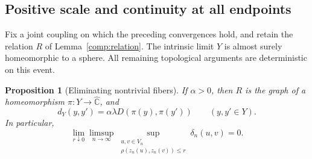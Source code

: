\documentclass[11pt]{article}
\numberwithin{equation}{section}
\newtheorem{proposition}[theorem]{Proposition}
\theoremstyle{definition}
\theoremstyle{remark}
\newcommand{\Chat}{\widehat{\mathbb C}}
\newcommand{\1}{\mathbf 1}
\begin{document}
\subsection{Positive scale and continuity at all endpoints}

Fix a joint coupling on which the preceding convergences hold, and
retain the relation $R$ of Lemma~\ref{comp:relation}.  The intrinsic
limit $Y$ is almost surely homeomorphic to a sphere.  All remaining
topological arguments are deterministic on this event.

\begin{proposition}[Eliminating nontrivial fibers]
\label{comp:positive-fibers}
If $\alpha>0$, then $R$ is the graph of a homeomorphism
$\pi:Y\to\Chat$, and
\begin{equation}
 \label{comp:proportionality}
 d_Y(y,y')=\alpha\lambda D(\pi(y),\pi(y'))
 \qquad(y,y'\in Y).
\end{equation}
In particular,
\begin{equation}
 \label{comp:endpoint-modulus}
 \lim_{r\downarrow0}\limsup_{n\to\infty}
 \sup_{\substack{u,v\in V_n\\\rho(z_n(u),z_n(v))\le r}}
 \delta_n(u,v)=0.
\end{equation}
\end{proposition}
\end{document}
